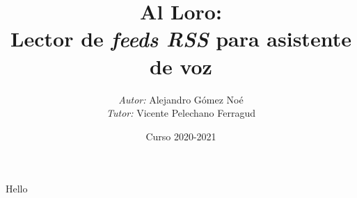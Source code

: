 \documentclass{beamer}
\title{Al Loro: \\Lector de \emph{feeds RSS} para asistente de voz}
\author{\emph{Autor:} Alejandro Gómez Noé\\[0.5em]\emph{Tutor:} Vicente Pelechano Ferragud}
\institute{ETSINF - Universidad Politécnica de Valencia}
\date{Curso 2020-2021}
\begin{document}
  
  \begin{frame}
    \titlepage
  \end{frame}
  
  \begin{frame}
    Hello
  \end{frame}
\end{document}
